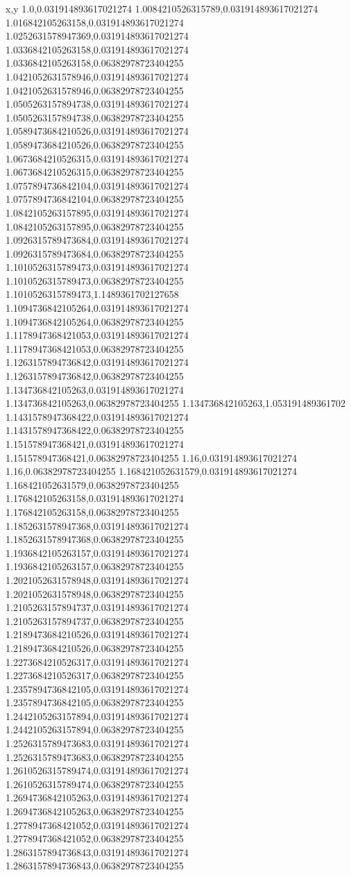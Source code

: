 x,y
1.0,0.031914893617021274
1.0084210526315789,0.031914893617021274
1.016842105263158,0.031914893617021274
1.0252631578947369,0.031914893617021274
1.0336842105263158,0.031914893617021274
1.0336842105263158,0.06382978723404255
1.0421052631578946,0.031914893617021274
1.0421052631578946,0.06382978723404255
1.0505263157894738,0.031914893617021274
1.0505263157894738,0.06382978723404255
1.0589473684210526,0.031914893617021274
1.0589473684210526,0.06382978723404255
1.0673684210526315,0.031914893617021274
1.0673684210526315,0.06382978723404255
1.0757894736842104,0.031914893617021274
1.0757894736842104,0.06382978723404255
1.0842105263157895,0.031914893617021274
1.0842105263157895,0.06382978723404255
1.0926315789473684,0.031914893617021274
1.0926315789473684,0.06382978723404255
1.1010526315789473,0.031914893617021274
1.1010526315789473,0.06382978723404255
1.1010526315789473,1.1489361702127658
1.1094736842105264,0.031914893617021274
1.1094736842105264,0.06382978723404255
1.1178947368421053,0.031914893617021274
1.1178947368421053,0.06382978723404255
1.1263157894736842,0.031914893617021274
1.1263157894736842,0.06382978723404255
1.134736842105263,0.031914893617021274
1.134736842105263,0.06382978723404255
1.134736842105263,1.053191489361702
1.1431578947368422,0.031914893617021274
1.1431578947368422,0.06382978723404255
1.151578947368421,0.031914893617021274
1.151578947368421,0.06382978723404255
1.16,0.031914893617021274
1.16,0.06382978723404255
1.168421052631579,0.031914893617021274
1.168421052631579,0.06382978723404255
1.176842105263158,0.031914893617021274
1.176842105263158,0.06382978723404255
1.1852631578947368,0.031914893617021274
1.1852631578947368,0.06382978723404255
1.1936842105263157,0.031914893617021274
1.1936842105263157,0.06382978723404255
1.2021052631578948,0.031914893617021274
1.2021052631578948,0.06382978723404255
1.2105263157894737,0.031914893617021274
1.2105263157894737,0.06382978723404255
1.2189473684210526,0.031914893617021274
1.2189473684210526,0.06382978723404255
1.2273684210526317,0.031914893617021274
1.2273684210526317,0.06382978723404255
1.2357894736842105,0.031914893617021274
1.2357894736842105,0.06382978723404255
1.2442105263157894,0.031914893617021274
1.2442105263157894,0.06382978723404255
1.2526315789473683,0.031914893617021274
1.2526315789473683,0.06382978723404255
1.2610526315789474,0.031914893617021274
1.2610526315789474,0.06382978723404255
1.2694736842105263,0.031914893617021274
1.2694736842105263,0.06382978723404255
1.2778947368421052,0.031914893617021274
1.2778947368421052,0.06382978723404255
1.2863157894736843,0.031914893617021274
1.2863157894736843,0.06382978723404255
